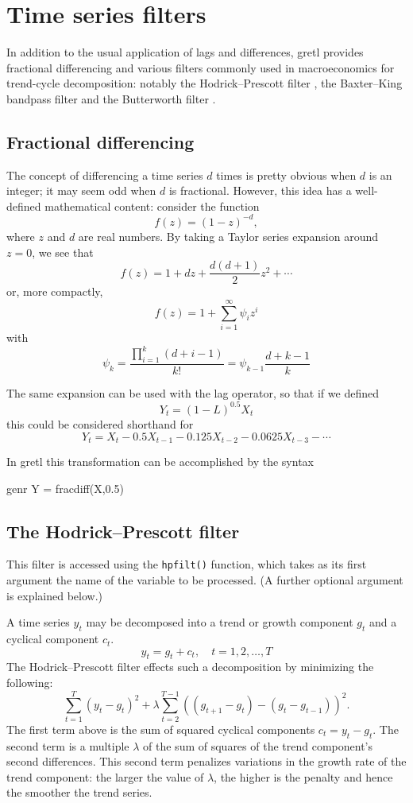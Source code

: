 \chapter{Time series filters}
\label{chap-filters}

In addition to the usual application of lags and differences,
gretl provides fractional differencing and various filters
commonly used in macroeconomics for trend-cycle decomposition: notably
the Hodrick--Prescott filter \citep{hodrick97}, the Baxter--King
bandpass filter \citep{baxter-king99} and the Butterworth
filter \citep{butterworth30}.

\section{Fractional differencing}
\label{sec:fracdiff}

The concept of differencing a time series $d$ times is pretty obvious
when $d$ is an integer; it may seem odd when $d$ is
fractional. However, this idea has a well-defined mathematical
content: consider the function
\[
  f(z) = (1 - z)^{-d},
\]
where $z$ and $d$ are real numbers. By taking a Taylor series
expansion around $z=0$, we see that
\[
  f(z) = 1 + dz + \frac{d (d+1)}{2} z^2 + \cdots 
\]
or, more compactly,
\[
  f(z) = 1 + \sum_{i=1}^{\infty} \psi_i z^i
\]
with
\[
  \psi_k = \frac{\prod_{i=1}^{k} (d+i-1) }{k!} = \psi_{k-1} \frac{d+k-1}{k}
\]

The same expansion can be used with the lag operator, so that if we defined
\[
  Y_t = (1-L)^{0.5} X_t
\]
this could be considered shorthand for
\[
Y_t = X_t - 0.5 X_{t-1} - 0.125 X_{t-2} - 0.0625 X_{t-3} - \cdots 
\]
    
In gretl this transformation can be accomplished by the syntax 
\begin{code}
genr Y = fracdiff(X,0.5)
\end{code}

\section{The Hodrick--Prescott filter}
\label{sec:hodrick-prescott}

This filter is accessed using the \verb+hpfilt()+ function, which
takes as its first argument the name of the variable to be processed.
(A further optional argument is explained below.)

A time series $y_t$ may be decomposed into a trend or growth
component $g_t$ and a cyclical component $c_t$.  
%
\[
y_t = g_t + c_t, \quad t = 1,2,\dots,T
\]
%
The Hodrick--Prescott filter effects such a decomposition by
minimizing the following:
%
\[
    \sum_{t = 1}^T {(y_t - g_t )^2 } + \lambda \sum_{t = 2}^{T -
      1} \left((g_{t+1} - g_t) - (g_t - g_{t - 1} )\right)^2 .
\]
%
The first term above is the sum of squared cyclical components $c_t =
y_t - g_t$. The second term is a multiple $\lambda$ of the sum of
squares of the trend component's second differences. This
second term penalizes variations in the growth rate of the trend
component: the larger the value of $\lambda$, the higher is the
penalty and hence the smoother the trend series.

